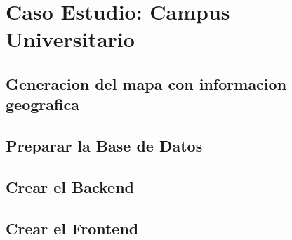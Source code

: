 \chapter{Caso Estudio: Campus Universitario}
\label{chap:Caso Estudio: Campus Universitario}

\section{Generacion del mapa con informacion geografica}
\label{sec:Generacion del mapa con informacion geografica}


\section{Preparar la Base de Datos}
\label{sec:Preparar la Base de datos}

\section{Crear el Backend}
\label{sec:section label}


\section{Crear el Frontend}
\label{sec:Crear el Frontend}
